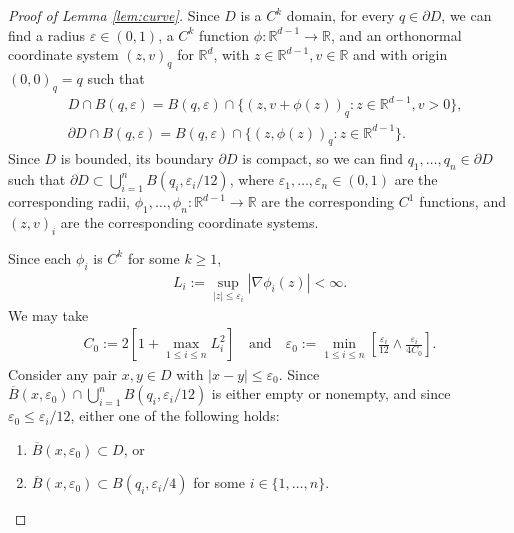 \documentclass[reqno]{amsart}
\newcommand{\R}{\mathbb R}
\newcommand{\1}{\mathbf 1}
\numberwithin{equation}{section}
\theoremstyle{definition}
\begin{document}
\begin{proof}[Proof of Lemma \ref{lem:curve}]
Since $D$ is a $C^k$ domain, for every $q \in \partial D$, we can find a radius $\varepsilon \in (0,1)$, a $C^k$ function $\phi:\R^{d-1} \to \R$, and an orthonormal coordinate system $(z,v)_q$ for $\R^d$, with $z \in \R^{d-1}, v \in \R$ and with origin $(0,0)_q=q$ such that
\begin{align*}
	&D \cap B(q,\varepsilon) = B(q,\varepsilon) \cap \{ (z,v+\phi(z))_q : z \in \R^{d-1}, v>0 \},\\
	&\partial D \cap B(q,\varepsilon) = B(q,\varepsilon) \cap \{ (z, \phi(z))_q : z \in \R^{d-1} \}.
\end{align*}
Since $D$ is bounded, its boundary $\partial D$ is compact, so we can find $q_1,\dots,q_n \in \partial D$ such that $\partial D \subset \bigcup_{i=1}^n B(q_i, \varepsilon_i/12)$, where $\varepsilon_1,\dots,\varepsilon_n \in (0,1)$ are the corresponding radii, $\phi_1,\dots, \phi_n :\R^{d-1} \to \R$ are the corresponding $C^1$ functions, and $(z,v)_i$ are the corresponding coordinate systems.

Since each $\phi_i$ is $C^k$ for some $k \ge 1$,
\begin{align}\label{curve:L}
	L_i := \sup_{|z| \le \varepsilon_i} |\nabla \phi_i(z)| < \infty.
\end{align}
We may take 
\begin{align}\label{curve:eps_0}
	C_0 := 2\left[1+\max_{1 \le i \le n}L_i^2\right]
	\quad \text{and}\quad
	\varepsilon_0 := \min_{1\le i\le n} \left[ \frac{\varepsilon_i}{12} \wedge \frac{\varepsilon_i}{4C_0} \right].
\end{align}
Consider any pair $x, y \in D$ with $|x-y| \le \varepsilon_0$.
Since $\overline{B}(x,\varepsilon_0) \cap \bigcup_{i=1}^n B(q_i, \varepsilon_i/12)$ is either empty or nonempty, and since $\varepsilon_0 \le \varepsilon_i/12$, either one of the following holds:
\begin{enumerate}
\item $\overline{B}(x, \varepsilon_0) \subset D$, or
\item $\overline{B}(x, \varepsilon_0) \subset B(q_i, \varepsilon_i/4)$ for some $i \in \{1,\dots, n\}$.
\end{enumerate}


\end{proof}
\end{document}
